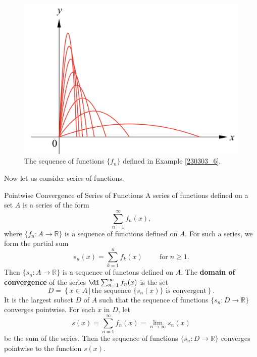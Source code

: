 \begin{figure}[ht]
\centering
\includegraphics[scale=0.2]{Picture56.png}
\caption{The sequence of functions $\{f_n\}$ defined in Example \ref{230303_6}.\fa}\label{figure56}
\end{figure}

Now let us consider series of functions.
\begin{definition}{Pointwise Convergence of Series of Functions}
A series of functions defined on a set $A$ is a series of the form
\[\sum_{n=1}^{\infty}f_n(x),\]
where $\{f_n:A\to\mathbb{R}\}$ is a sequence of functions defined on $A$. For such a series, we form the partial sum
\[s_n(x)=\sum_{k=1}^n f_k(x)\hspace{1cm}\text{for}\;n\geq 1.\]
Then $\{s_n:A\to\mathbb{R}\}$ is a sequence of functons defined on $A$. The {\bf domain of convergence} of the series $\di\sum_{n=1}^{\infty}f_n(x)$ is the set
\[D=\left\{x\in A\,|\, \text{the sequence $\{s_n(x)\}$ is convergent}\right\}.\]
It is the largest subset $D$ of $A$ such that the sequence of functions
$\{s_n:D\to\mathbb{R}\}$ converges pointwise.  
For each $x$ in   $D$, let \[s(x)=\sum_{n=1}^{\infty}f_n(x)=\lim_{n\to\infty}s_n(x)\]
be the sum of the series. Then the  sequence of functions
$\{s_n:D\to\mathbb{R}\}$ converges pointwise to the function $s(x)$.
\end{definition}

